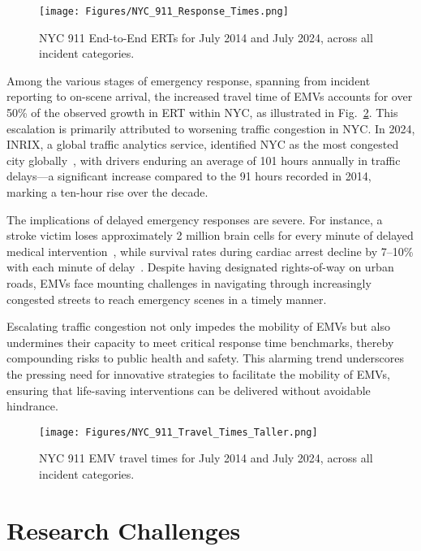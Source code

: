 \begin{figure}[h]
    \centering
    \texttt{[image: Figures/NYC\_911\_Response\_Times.png]}
    \caption{NYC 911 End-to-End ERTs for July 2014 and July 2024, across all incident categories.}
    \label{fig:ERT_NYC}
\end{figure}

Among the various stages of emergency response, spanning from incident reporting to on-scene arrival, the increased travel time of EMVs accounts for over 50\% of the observed growth in ERT within NYC, as illustrated in Fig.~\ref{fig:EMV_travel_NYC}. This escalation is primarily attributed to worsening traffic congestion in NYC. In 2024, INRIX, a global traffic analytics service, identified NYC as the most congested city globally~\cite{INRIXScorecard}, with drivers enduring an average of 101 hours annually in traffic delays---a significant increase compared to the 91 hours recorded in 2014, marking a ten-hour rise over the decade.

The implications of delayed emergency responses are severe. For instance, a stroke victim loses approximately 2 million brain cells for every minute of delayed medical intervention~\cite{Time2006Jeffrey}, while survival rates during cardiac arrest decline by 7--10\% with each minute of delay~\cite{Heart2013}. Despite having designated rights-of-way on urban roads, EMVs face mounting challenges in navigating through increasingly congested streets to reach emergency scenes in a timely manner. 

Escalating traffic congestion not only impedes the mobility of EMVs but also undermines their capacity to meet critical response time benchmarks, thereby compounding risks to public health and safety. This alarming trend underscores the pressing need for innovative strategies to facilitate the mobility of EMVs, ensuring that life-saving interventions can be delivered without avoidable hindrance.

\begin{figure}[ht]
    \centering
    \texttt{[image: Figures/NYC\_911\_Travel\_Times\_Taller.png]}
    \caption{NYC 911 EMV travel times for July 2014 and July 2024, across all incident categories.}
    \label{fig:EMV_travel_NYC}
\end{figure}

\section{Research Challenges}\label{sec:challenges}

